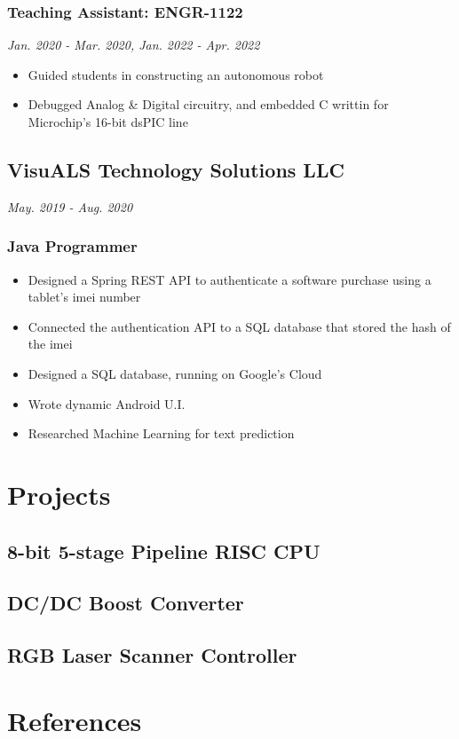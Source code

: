 \documentclass{article}
\begin{document}
\begin{spacing}{.5}
		\subsubsection{\small{Teaching Assistant: ENGR-1122}} \hfill \scriptsize{\textsl{Jan. 2020 - Mar. 2020, Jan. 2022 - Apr. 2022}}
			\begin{itemize}[label=--,itemsep=-.75ex]
				\item \small{Guided students in constructing an autonomous robot}
				\item \small{Debugged Analog \& Digital circuitry, and embedded C writtin for Microchip's 16-bit dsPIC line}
			\end{itemize}
	\subsection{VisuALS Technology Solutions LLC} \hfill \scriptsize{\textsl{May. 2019 - Aug. 2020}}
		\subsubsection{\small{Java Programmer}}
			\begin{itemize}[label=--,itemsep=-.75ex]
				\item \small{Designed a Spring REST API to authenticate a software purchase using a tablet's imei number}
				\item \small{Connected the authentication API to a SQL database that stored the hash of the imei}
				\item \small{Designed a SQL database, running on Google's Cloud}
				\item \small{Wrote dynamic Android U.I.}
				\item \small{Researched Machine Learning for text prediction}
			\end{itemize}

\section{Projects}
	\subsection{8-bit 5-stage Pipeline RISC CPU}
	\subsection{DC/DC Boost Converter}
	\subsection{RGB Laser Scanner Controller}

\section{References}

\end{spacing}
\end{document}
